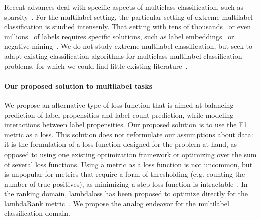 Recent advances deal with specific aspects of multiclass classification, such as sparsity~\citep{focalLoss,tencent}. For the multilabel setting, the particular setting of extreme multilabel classification is studied intensenly. That setting with tens of thousands~\cite{extremeClassification} or even millions~\cite{millionsOfLabels, extremeMilliionsSlice} of labels requires specific solutions, such as label embeddings~\cite{extremeMultilabelEmbeddings} or negative mining~\cite{stochasticNegativeMining}. We do not study extreme multilabel classification, but seek to adapt existing classification algorithms for multiclass multilabel classification problems, for which we could find little existing literature~\citep{multilabelMethods}.


\paragraph{Our proposed solution to multilabel tasks}
We propose an alternative type of loss function that is aimed at balancing prediction of label propensities and label count prediction, while modeling interactions between label propensities. Our proposed solution is to use the F1 metric as a loss. This solution does not reformulate our assumptions about data: it is the formulation of a loss function designed for the problem at hand, as opposed to using one existing optimization framework or optimizing over the sum of several loss functions.
Using a metric as a loss function is not uncommon, but is unpopular for metrics that require a form of thresholding (e.g. counting the number of true positives), as minimizing a step loss function is intractable~\cite{stochasticNegativeMining}. In the ranking domain, lambdaloss has been proposed to optimize directly for the lambdaRank metric~\cite{lambdaLoss}. We propose the analog endeavor for the multilabel classification domain. 

